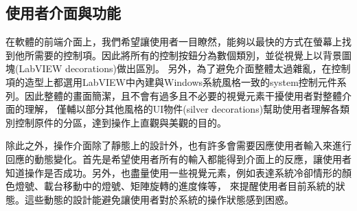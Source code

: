 \documentclass[12pt]{article}
\begin{document}
\subsection{使用者介面與功能}
在軟體的前端介面上，我們希望讓使用者一目瞭然，能夠以最快的方式在螢幕上找到他所需要的控制項。因此將所有的控制按鈕分為數個類別，並從視覺上以背景圖塊(LabVIEW decorations)做出區別。
另外，為了避免介面整體太過雜亂，在控制項的造型上都選用LabVIEW中內建與Windows系統風格一致的system控制元件系列。因此整體的畫面簡潔，且不會有過多且不必要的視覺元素干擾使用者對整體介面的理解，
僅輔以部分其他風格的UI物件(silver decorations)幫助使用者理解各類別控制原件的分區，達到操作上直觀與美觀的目的。

除此之外，操作介面除了靜態上的設計外，也有許多會需要因應使用者輸入來進行回應的動態變化。首先是希望使用者所有的輸入都能得到介面上的反應，讓使用者知道操作是否成功。另外，也盡量使用一些視覺元素，例如表達系統冷卻情形的顏色燈號、載台移動中的燈號、矩陣旋轉的進度條等，
來提醒使用者目前系統的狀態。這些動態的設計能避免讓使用者對於系統的操作狀態感到困惑。
\end{document}
